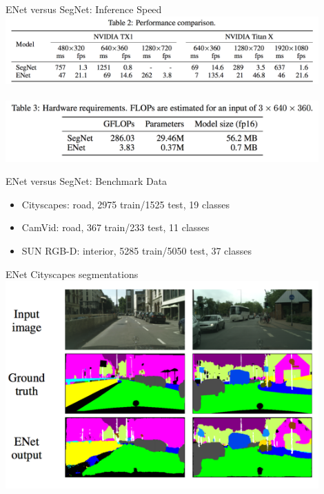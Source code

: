 \documentclass[]{beamer}
\begin{document}
\begin{frame}{ENet versus SegNet: Inference Speed}
\centering
\includegraphics[width=0.9\textwidth]{figures/enet-vs-segnet-speed} \\
\hspace*{\fill} \\
\includegraphics[width=0.9\textwidth]{figures/enet-vs-segnet-gflops-size}
\end{frame}

\begin{frame}{ENet versus SegNet: Benchmark Data}
\begin{itemize}
\item Cityscapes: road, 2975 train/1525 test, 19 classes
\item CamVid: road, 367 train/233 test, 11 classes
\item SUN RGB-D: interior, 5285 train/5050 test, 37 classes
\end{itemize}
\end{frame}

\begin{frame}{ENet Cityscapes segmentations}
\centering
\includegraphics[width=0.9\textwidth]{figures/enet-cityscapes}
\end{frame}
\end{document}
